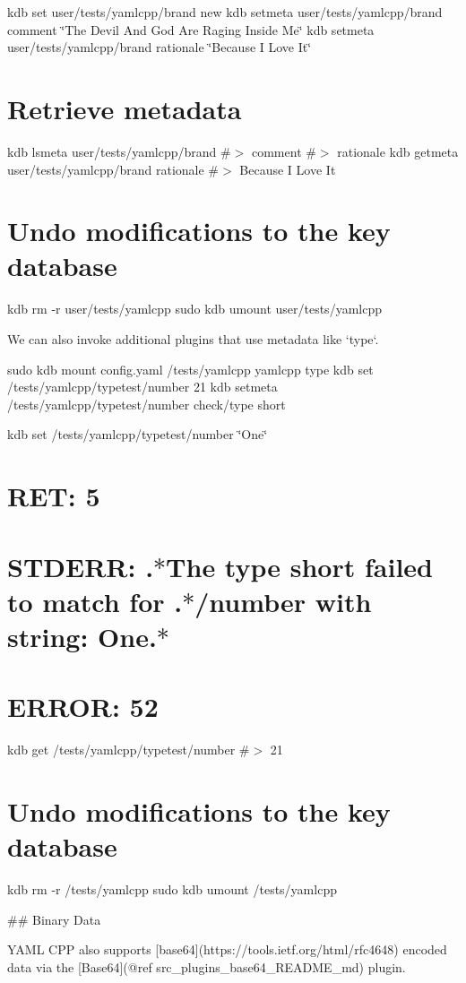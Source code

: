 kdb set user/tests/yamlcpp/brand new kdb setmeta user/tests/yamlcpp/brand comment \char`\"{}\+The Devil And God Are Raging Inside Me\char`\"{} kdb setmeta user/tests/yamlcpp/brand rationale \char`\"{}\+Because I Love It\char`\"{}

\section*{Retrieve metadata}

kdb lsmeta user/tests/yamlcpp/brand \#$>$ comment \#$>$ rationale kdb getmeta user/tests/yamlcpp/brand rationale \#$>$ Because I Love It

\section*{Undo modifications to the key database}

kdb rm -\/r user/tests/yamlcpp sudo kdb umount user/tests/yamlcpp 
\begin{DoxyCode}
We can also invoke additional plugins that use metadata like `type`.
\end{DoxyCode}
 sudo kdb mount config.\+yaml /tests/yamlcpp yamlcpp type kdb set /tests/yamlcpp/typetest/number 21 kdb setmeta /tests/yamlcpp/typetest/number check/type short

kdb set /tests/yamlcpp/typetest/number \char`\"{}\+One\char`\"{} \section*{R\+ET\+: 5}

\section*{S\+T\+D\+E\+RR\+: .$\ast$\+The type short failed to match for .$\ast$/number with string\+: One.$\ast$}

\section*{E\+R\+R\+OR\+: 52}

kdb get /tests/yamlcpp/typetest/number \#$>$ 21

\section*{Undo modifications to the key database}

kdb rm -\/r /tests/yamlcpp sudo kdb umount /tests/yamlcpp 
\begin{DoxyCode}
## Binary Data

YAML CPP also supports [base64](https://tools.ietf.org/html/rfc4648) encoded data via the [Base64](@ref
       src\_plugins\_base64\_README\_md) plugin.
\end{DoxyCode}
